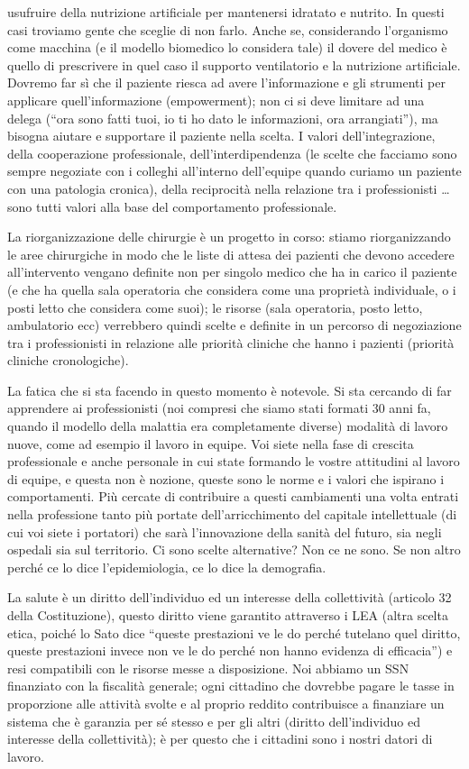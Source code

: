 usufruire della nutrizione artificiale per mantenersi idratato e
nutrito. In questi casi troviamo gente che sceglie di non farlo. Anche
se, considerando l'organismo come macchina (e il modello biomedico lo
considera tale) il dovere del medico è quello di prescrivere in quel
caso il supporto ventilatorio e la nutrizione artificiale. Dovremo far
sì che il paziente riesca ad avere l'informazione e gli strumenti per
applicare quell'informazione (empowerment); non ci si deve limitare ad
una delega (``ora sono fatti tuoi, io ti ho dato le informazioni, ora
arrangiati''), ma bisogna aiutare e supportare il paziente nella scelta.
I valori dell'integrazione, della cooperazione professionale,
dell'interdipendenza (le scelte che facciamo sono sempre negoziate con i
colleghi all'interno dell'equipe quando curiamo un paziente con una
patologia cronica), della reciprocità nella relazione tra i
professionisti \ldots{} sono tutti valori alla base del comportamento
professionale.

La riorganizzazione delle chirurgie è un progetto in corso: stiamo
riorganizzando le aree chirurgiche in modo che le liste di attesa dei
pazienti che devono accedere all'intervento vengano definite non per
singolo medico che ha in carico il paziente (e che ha quella sala
operatoria che considera come una proprietà individuale, o i posti letto
che considera come suoi); le risorse (sala operatoria, posto letto,
ambulatorio ecc) verrebbero quindi scelte e definite in un percorso di
negoziazione tra i professionisti in relazione alle priorità cliniche
che hanno i pazienti (priorità cliniche cronologiche).

La fatica che si sta facendo in questo momento è notevole. Si sta
cercando di far apprendere ai professionisti (noi compresi che siamo
stati formati 30 anni fa, quando il modello della malattia era
completamente diverse) modalità di lavoro nuove, come ad esempio il
lavoro in equipe. Voi siete nella fase di crescita professionale e anche
personale in cui state formando le vostre attitudini al lavoro di
equipe, e questa non è nozione, queste sono le norme e i valori che
ispirano i comportamenti. Più cercate di contribuire a questi
cambiamenti una volta entrati nella professione tanto più portate
dell'arricchimento del capitale intellettuale (di cui voi siete i
portatori) che sarà l'innovazione della sanità del futuro, sia negli
ospedali sia sul territorio. Ci sono scelte alternative? Non ce ne sono.
Se non altro perché ce lo dice l'epidemiologia, ce lo dice la
demografia.

La salute è un diritto dell'individuo ed un interesse della collettività
(articolo 32 della Costituzione), questo diritto viene garantito
attraverso i LEA (altra scelta etica, poiché lo Sato dice ``queste
prestazioni ve le do perché tutelano quel diritto, queste prestazioni
invece non ve le do perché non hanno evidenza di efficacia'') e resi
compatibili con le risorse messe a disposizione. Noi abbiamo un SSN
finanziato con la fiscalità generale; ogni cittadino che dovrebbe pagare
le tasse in proporzione alle attività svolte e al proprio reddito
contribuisce a finanziare un sistema che è garanzia per sé stesso e per
gli altri (diritto dell'individuo ed interesse della collettività); è
per questo che i cittadini sono i nostri datori di lavoro.